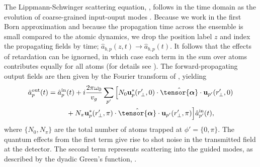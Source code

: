 \documentclass[aps,pra,twocolumn]{revtex4-1} %
\newcommand{\poltens}{\hat{\tensor{\boldsymbol{\alpha}}}}
\begin{document}
The Lippmann-Schwinger scattering equation, , follows in the time domain as the evolution of coarse-grained input-ouput modes \cite{gardiner_input_1985, fan_input-output_2010, le_kien_propagation_2014}.  
{\color{blue} Because we work in the first Born approximation and because the propagation time across the ensemble is small compared to the atomic dynamics, we drop the position label $z$ and index the propagating fields by time; $\hat{a}_{b,p}(z,t) \rightarrow \hat{a}_{b,p}(t) $. It follows that the effects of retardation can be ignorned, in which case each term in the sum over atoms contributes equally for all atoms} (for details see \cite{le_kien_correlations_2008, baragiola_open_2014}).  
The forward-propagating output fields are then given by the Fourier transform of , yielding \cite{le_kien_correlations_2008} 
\begin{align} \label{Eq::ScatteringSolution}
		\hat{a}^{\rm out}_{p}(t) = \hat{a}^{\rm in}_{p}&(t) + i  \frac{2\pi \omega_0}{v_g}\sum_{p'}\Big[ N_0  \mathbf{u}^*_p(r'_\perp,0) \cdot \poltens \cdot  \mathbf{u}_{p'}(r'_\perp,0)  \nn\\
		&+ N_\pi \mathbf{u}^*_p(r'_\perp,\pi) \cdot \poltens \cdot  \mathbf{u}_{p'}(r'_\perp,\pi) \Big] \hat{a}^{\rm in}_{p'}(t),
	\end{align} 
where $\{N_0,N_\pi \}$ are the total number of atoms trapped at $\phi' = \{0,\pi\}$. The quantum effects from the first term give rise to shot noise in the transmitted field at the detector.  
The second term represents scattering into the guided modes, as described by the dyadic Green's function, .  
\end{document}
